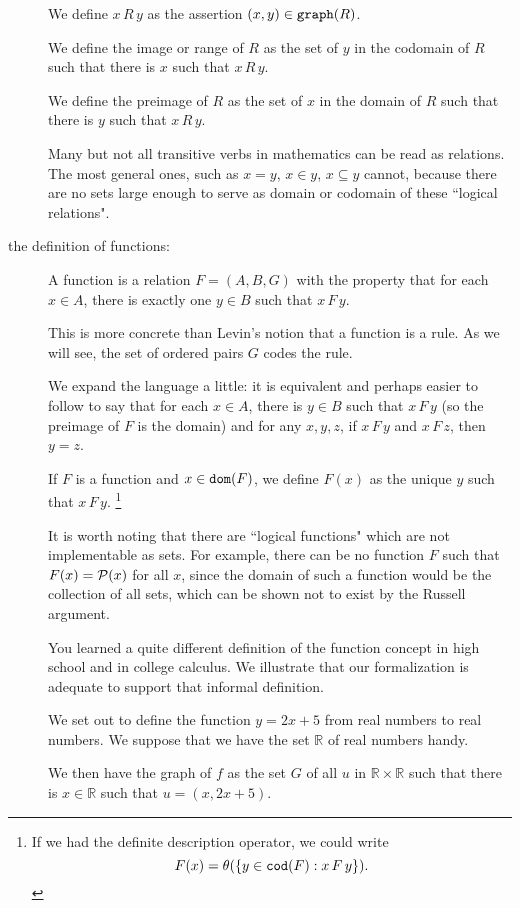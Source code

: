 \documentclass[12pt]{article}
\begin{document}
\begin{description}
We define $x \,R\, y$ as the assertion $(x,y) \in {\tt graph}(R)$.

We define the image or range of $R$ as the set of $y$ in the codomain of $R$ such that there is $x$ such that $x \, R \, y$.

We define the preimage of $R$ as the set of $x$ in the domain of $R$ such that there is $y$ such that $x \, R \, y$.

Many but not all transitive verbs in mathematics can be read as relations.  The most general ones, such
as $x = y$, $x \in y$, $x \subseteq y$ cannot, because there are no sets large enough to serve as domain or codomain of these ``logical relations".

\item[the definition of functions:]

A function is a relation $F = (A,B,G)$ with the property that for each $x \in A$, there is exactly one $y \in B$ such that $x \, F \, y$.

This is more concrete than Levin's notion that a function is a rule.  As we will see, the set of ordered pairs $G$ codes the rule.

We expand the language a little:  it is equivalent and perhaps easier to follow to say that for each $x \in A$, there is $y \in B$ such that $x \, F\, y$ (so the preimage of $F$ is the domain) and for any $x,y,z$, if $x \, F \, y$ and $x \, F\, z$, then $y=z$.

If $F$ is a function and $x \in {\tt dom}(F)$, we define $F(x)$ as the unique $y$ such that $x \, F \, y$.  \footnote{If we had the definite description operator, we could write $$F(x) = \theta(\{y\in {\tt cod}(F):x \, F \, y\}).$$}

It is worth noting that there are ``logical functions" which are not implementable as sets.  For example,
there can be no function $F$ such that $F(x) = {\cal P}(x)$ for all $x$, since the domain of such a function would be the collection of all sets, which can be shown not to exist by the Russell argument.

You learned a quite different definition of the function concept in high school and in college calculus.  We illustrate that our formalization is adequate to support that informal definition.

We set out to define the function $y=2x+5$ from real numbers to real numbers.  We suppose that we have the set
$\mathbb R$ of real numbers handy.

We then have the graph of $f$ as the set $G$ of all $u$ in $\mathbb R \times \mathbb R$ such that there is $x \in \mathbb R$ such that $u = (x,2x+5)$.


\end{description}
\end{document}
